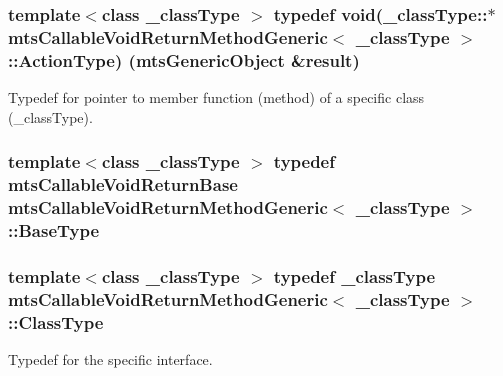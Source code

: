 \subsubsection[{Action\+Type}]{\setlength{\rightskip}{0pt plus 5cm}template$<$class \+\_\+class\+Type $>$ typedef void(\+\_\+class\+Type\+::$\ast$ {\bf mts\+Callable\+Void\+Return\+Method\+Generic}$<$ \+\_\+class\+Type $>$\+::Action\+Type) ({\bf mts\+Generic\+Object} \&result)}\label{classmts_callable_void_return_method_generic_ad94bb941833d1c2d74bb718f3bf81456}
Typedef for pointer to member function (method) of a specific class (\+\_\+class\+Type). \hypertarget{classmts_callable_void_return_method_generic_aa1fd13b7b6b83b7825a8e7c56e9ac8cd}{}
\subsubsection[{Base\+Type}]{\setlength{\rightskip}{0pt plus 5cm}template$<$class \+\_\+class\+Type $>$ typedef {\bf mts\+Callable\+Void\+Return\+Base} {\bf mts\+Callable\+Void\+Return\+Method\+Generic}$<$ \+\_\+class\+Type $>$\+::{\bf Base\+Type}}\label{classmts_callable_void_return_method_generic_aa1fd13b7b6b83b7825a8e7c56e9ac8cd}
\hypertarget{classmts_callable_void_return_method_generic_ac65a16eb6baf786e6eba07bb920cbf1f}{}
\subsubsection[{Class\+Type}]{\setlength{\rightskip}{0pt plus 5cm}template$<$class \+\_\+class\+Type $>$ typedef \+\_\+class\+Type {\bf mts\+Callable\+Void\+Return\+Method\+Generic}$<$ \+\_\+class\+Type $>$\+::{\bf Class\+Type}}\label{classmts_callable_void_return_method_generic_ac65a16eb6baf786e6eba07bb920cbf1f}
Typedef for the specific interface. \hypertarget{classmts_callable_void_return_method_generic_a0c47816060134c2ec22f9287de913cc5}{}
